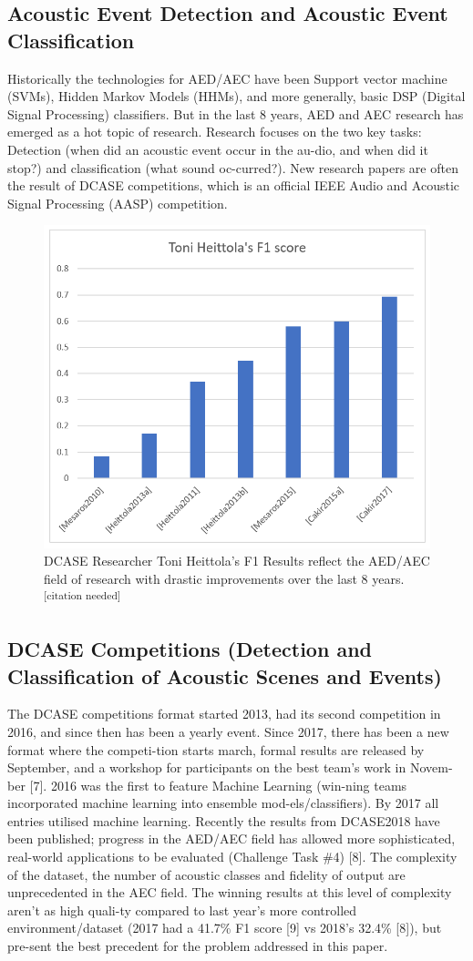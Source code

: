 \documentclass{UoNMCHA}
\newcommand{\citationneeded}{\textsuperscript{\color{blue} [citation needed]}}
\numberwithin{equation}{section}
\begin{document}
\subsection{Acoustic Event Detection and Acoustic Event Classification}
Historically the technologies for AED/AEC have been Support vector machine (SVMs), Hidden Markov Models (HHMs), and more generally, basic DSP (Digital Signal Processing) classifiers. But in the last 8 years, AED and AEC research has emerged as a hot topic of research. Research focuses on the two key tasks: Detection (when did an acoustic event occur in the au-dio, and when did it stop?) and classification (what sound oc-curred?). New research papers are often the result of DCASE competitions, which is an official IEEE Audio and Acoustic Signal Processing (AASP) competition.
\begin{figure}[ht]
    \begin{center}
        \includegraphics[width=.6\linewidth]{Figures/F1_score.PNG}
        \caption{DCASE Researcher Toni Heittola's F1 Results reflect the AED/AEC field of research with drastic improvements over the last 8 years. \citationneeded}
        \label{fig:Sinc}
    \end{center}
\end{figure}
\subsection{DCASE Competitions (Detection and Classification of Acoustic Scenes and Events)}
The DCASE competitions format started 2013, had its second competition in 2016, and since then has been a yearly event. Since 2017, there has been a new format where the competi-tion starts march, formal results are released by September, and a workshop for participants on the best team’s work in Novem-ber [7]. 2016 was the first to feature Machine Learning (win-ning teams incorporated machine learning into ensemble mod-els/classifiers). By 2017 all entries utilised machine learning. Recently the results from DCASE2018 have been published; progress in the AED/AEC field has allowed more sophisticated, real-world applications to be evaluated (Challenge Task \#4) [8]. The complexity of the dataset, the number of acoustic classes and fidelity of output are unprecedented in the AEC field. The winning results at this level of complexity aren’t as high quali-ty compared to last year’s more controlled environment/dataset (2017 had a 41.7\% F1 score [9] vs 2018’s 32.4\% [8]), but pre-sent the best precedent for the problem addressed in this paper.
\end{document}
